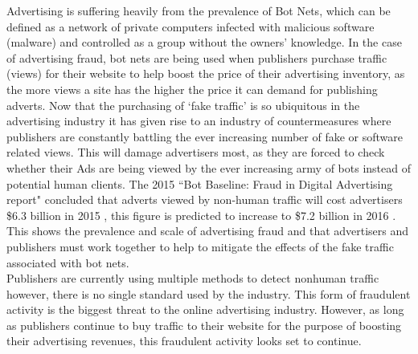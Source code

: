 \documentclass[12pt]{article}
\begin{document}
Advertising is suffering heavily from the prevalence of Bot Nets, which can be defined as a network of private computers infected with malicious software (malware)  and controlled as a group without the owners' knowledge. In the case of advertising fraud, bot nets are being used when publishers purchase traffic (views) for their website to help boost the price of their advertising inventory, as the more views a site has the higher the price it can demand for publishing adverts. Now that the purchasing of `fake traffic' is so ubiquitous in the advertising industry it has given rise to an industry of countermeasures \parencite{bloomFraud} where publishers are constantly battling the ever increasing number of fake or software related views. This will damage advertisers most, as they are forced to check whether their Ads are being viewed by the ever increasing army of bots instead of potential human clients. The 2015 ``Bot Baseline: Fraud in Digital Advertising report" concluded that adverts viewed by non-human traffic will cost advertisers \$6.3 billion in 2015 \parencite{botfraud2015}, this figure is predicted to increase to \$7.2 billion in 2016 \parencite{botfraud2016}. This shows the prevalence and scale of advertising fraud and that advertisers and publishers must work together to help to mitigate the effects of the fake traffic associated with bot nets. \\

Publishers are currently using multiple methods to detect nonhuman traffic however, there is no single standard used by the industry. This form of fraudulent activity is the biggest threat to the online advertising industry. However, as long as publishers continue to buy traffic to their website for the purpose of boosting their advertising revenues, this fraudulent activity looks set to continue.

\end{document}
